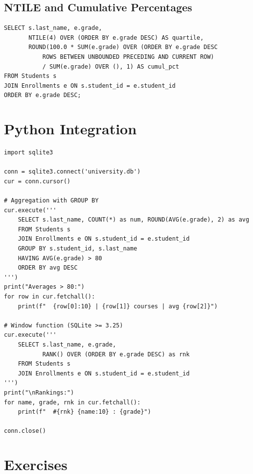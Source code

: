 \subsection{NTILE and Cumulative Percentages}

\begin{codeblock}[title=\textbf{Quartiles and Cumulative Percentage}]
\begin{verbatim}
SELECT s.last_name, e.grade,
       NTILE(4) OVER (ORDER BY e.grade DESC) AS quartile,
       ROUND(100.0 * SUM(e.grade) OVER (ORDER BY e.grade DESC
           ROWS BETWEEN UNBOUNDED PRECEDING AND CURRENT ROW)
           / SUM(e.grade) OVER (), 1) AS cumul_pct
FROM Students s
JOIN Enrollments e ON s.student_id = e.student_id
ORDER BY e.grade DESC;
\end{verbatim}
\end{codeblock}

\section{Python Integration}

\begin{codeblock}[title=\textbf{Aggregation and Window Functions with Python}]
\begin{verbatim}
import sqlite3

conn = sqlite3.connect('university.db')
cur = conn.cursor()

# Aggregation with GROUP BY
cur.execute('''
    SELECT s.last_name, COUNT(*) as num, ROUND(AVG(e.grade), 2) as avg
    FROM Students s
    JOIN Enrollments e ON s.student_id = e.student_id
    GROUP BY s.student_id, s.last_name
    HAVING AVG(e.grade) > 80
    ORDER BY avg DESC
''')
print("Averages > 80:")
for row in cur.fetchall():
    print(f"  {row[0]:10} | {row[1]} courses | avg {row[2]}")

# Window function (SQLite >= 3.25)
cur.execute('''
    SELECT s.last_name, e.grade,
           RANK() OVER (ORDER BY e.grade DESC) as rnk
    FROM Students s
    JOIN Enrollments e ON s.student_id = e.student_id
''')
print("\nRankings:")
for name, grade, rnk in cur.fetchall():
    print(f"  #{rnk} {name:10} : {grade}")

conn.close()
\end{verbatim}
\end{codeblock}

\section*{Exercises}

